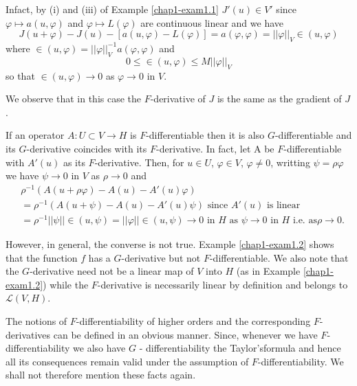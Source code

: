 In\pageoriginale fact, by (i) and (iii) of Example \ref{chap1-exam1.1} $J'(u) \in V'$ since $\varphi \mapsto a(u, \varphi)$ and $\varphi \mapsto L(\varphi)$ are continuous linear and we have
$$
J(u + \varphi) - J(u) - [a(u, \varphi) - L(\varphi)] = a(\varphi, \varphi) = ||\varphi||_{V} \in (u, \varphi)
$$
where $\in (u, \varphi) = ||\varphi||_{V}^{-1} a(\varphi, \varphi)$ and
$$
0 \leq \in (u, \varphi) \leq M||\varphi||_{V}
$$
so that $\in (u, \varphi) \to 0$ as $\varphi \to 0$ in $V$.

We observe that in this case the $F$-derivative of $J$ is the same as the gradient of $J$.

\begin{remark}\label{chap1-rem6.1}
If an operator $A : U \subset V \to H$ is $F$-differentiable then it is also $G$-differentiable and its $G$-derivative coincides with its $F$-derivative. In fact, let A be $F$-differentiable with $A'(u)$ as its $F$-derivative. Then, for $u \in U$, $\varphi \in V$, $\varphi \neq 0$, writting $\psi = \rho \varphi$ we have $\psi \to 0$ in $V$ as $\rho \to 0$ and 
\begin{align*}
& \rho^{-1} (A(u + \rho \varphi) - A(u) - A'(u)\varphi)\\
& = \rho^{-1} (A(u + \psi) - A(u) - A'(u)\psi) \text{ since }  A'(u) \text{ is linear }\\
& = \rho^{-1} ||\psi|| \in (u, \psi) = ||\varphi|| \in (u, \psi) \to 0 \text{ in } H \text{ as } \psi \to 0 \text{ in } H \text{ i.e. as} \rho \to 0.
\end{align*}
\end{remark}

\begin{remark}\label{chap1-rem6.2}
However, in general, the converse is not true. Example \ref{chap1-exam1.2} shows that the function $f$ has a $G$-derivative but not $F$-differentiable. We also note that the $G$-derivative need not be a linear map of $V$ into $H$ (as in Example \ref{chap1-exam1.2}) while the $F$-derivative is necessarily linear by definition and belongs to $\mathscr{L}(V, H)$.
\end{remark}

\begin{remark}\label{chap1-rem6.3}
The notions of $F$-differentiability of higher orders and the
corresponding $F$-derivatives can be defined in an obvious
manner. Since, whenever we have $F$-differentiability we also have $G$
- differentiability the Taylor's\pageoriginale formula and hence all
its consequences remain valid under the assumption of
$F$-differentiability. We shall not therefore mention these facts
again. 
\end{remark}

